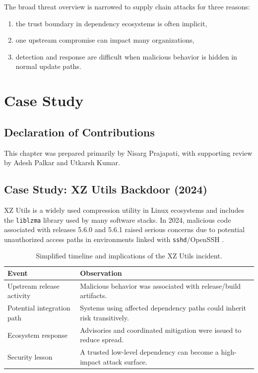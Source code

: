 The broad threat overview is narrowed to supply chain attacks for three reasons:

\begin{enumerate}[label=(\roman*)]
\item the trust boundary in dependency ecosystems is often implicit,
\item one upstream compromise can impact many organizations,
\item detection and response are difficult when malicious behavior is hidden in normal update paths.
\end{enumerate}

\chapter{Case Study}
\label{ch:casestudy}

\section*{Declaration of Contributions}
This chapter was prepared primarily by Nisarg Prajapati, with supporting review by
Adesh Palkar and Utkarsh Kumar.

\section{Case Study: XZ Utils Backdoor (2024)}

XZ Utils is a widely used compression utility in Linux ecosystems and includes
the \texttt{liblzma} library used by many software stacks.
In 2024, malicious code associated with releases 5.6.0 and 5.6.1 raised serious
concerns due to potential unauthorized access paths in environments linked with
\texttt{sshd}/OpenSSH \citep{nvd2024cve3094,redhat2024xz}.

\begin{table}[htbp]
\centering
\caption{Simplified timeline and implications of the XZ Utils incident.}
\label{tab:xz-timeline}
\begin{tabular}{p{} p{}}
\toprule
\textbf{Event} & \textbf{Observation} \\
\midrule
Upstream release activity & Malicious behavior was associated with release/build artifacts.\\
Potential integration path & Systems using affected dependency paths could inherit risk transitively.\\
Ecosystem response & Advisories and coordinated mitigation were issued to reduce spread.\\
Security lesson & A trusted low-level dependency can become a high-impact attack surface.\\
\bottomrule
\end{tabular}
\end{table}

